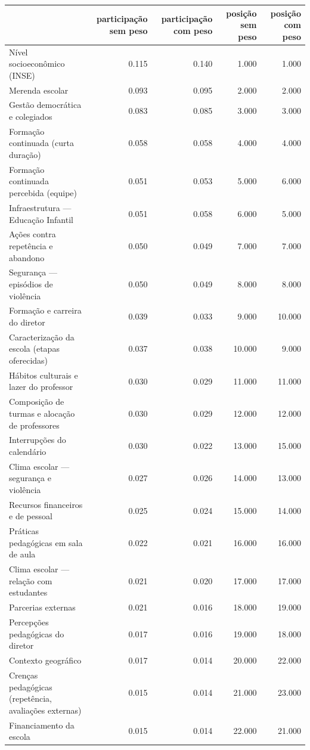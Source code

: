 \begin{tabular}{lrrrr}
\toprule
 & participação sem peso & participação com peso & posição sem peso & posição com peso \\
\midrule
Nível socioeconômico (INSE) & 0.115 & 0.140 & 1.000 & 1.000 \\
Merenda escolar & 0.093 & 0.095 & 2.000 & 2.000 \\
Gestão democrática e colegiados & 0.083 & 0.085 & 3.000 & 3.000 \\
Formação continuada (curta duração) & 0.058 & 0.058 & 4.000 & 4.000 \\
Formação continuada percebida (equipe) & 0.051 & 0.053 & 5.000 & 6.000 \\
Infraestrutura — Educação Infantil & 0.051 & 0.058 & 6.000 & 5.000 \\
Ações contra repetência e abandono & 0.050 & 0.049 & 7.000 & 7.000 \\
Segurança — episódios de violência & 0.050 & 0.049 & 8.000 & 8.000 \\
Formação e carreira do diretor & 0.039 & 0.033 & 9.000 & 10.000 \\
Caracterização da escola (etapas oferecidas) & 0.037 & 0.038 & 10.000 & 9.000 \\
Hábitos culturais e lazer do professor & 0.030 & 0.029 & 11.000 & 11.000 \\
Composição de turmas e alocação de professores & 0.030 & 0.029 & 12.000 & 12.000 \\
Interrupções do calendário & 0.030 & 0.022 & 13.000 & 15.000 \\
Clima escolar — segurança e violência & 0.027 & 0.026 & 14.000 & 13.000 \\
Recursos financeiros e de pessoal & 0.025 & 0.024 & 15.000 & 14.000 \\
Práticas pedagógicas em sala de aula & 0.022 & 0.021 & 16.000 & 16.000 \\
Clima escolar — relação com estudantes & 0.021 & 0.020 & 17.000 & 17.000 \\
Parcerias externas & 0.021 & 0.016 & 18.000 & 19.000 \\
Percepções pedagógicas do diretor & 0.017 & 0.016 & 19.000 & 18.000 \\
Contexto geográfico & 0.017 & 0.014 & 20.000 & 22.000 \\
Crenças pedagógicas (repetência, avaliações externas) & 0.015 & 0.014 & 21.000 & 23.000 \\
Financiamento da escola & 0.015 & 0.014 & 22.000 & 21.000 \\

\end{tabular}
